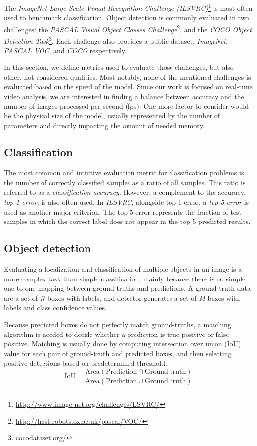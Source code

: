 The \textit{ImageNet Large Scale Visual Recognition Challenge (ILSVRC)}\footnote{\url{http://www.image-net.org/challenges/LSVRC/}} is most often used to benchmark classification. Object detection is commonly evaluated in two challenges: the \textit{PASCAL Visual Object Classes Challenge}\footnote{\url{http://host.robots.ox.ac.uk/pascal/VOC/}}, and the \textit{COCO Object Detection Task}\footnote{\url{cocodataset.org/}}. Each challenge also provides a public dataset, \textit{ImageNet}, \textit{PASCAL VOC}, and \textit{COCO} respectively.

In this section, we define metrics used to evaluate those challenges, but also other, not considered qualities. Most notably, none of the mentioned challenges is evaluated based on the speed of the model. Since our work is focused on real-time video analysis, we are interested in finding a balance between accuracy and the number of images processed per second (fps). One more factor to consider would be the physical size of the model, usually represented by the number of parameters and directly impacting the amount of needed memory.

\subsection{Classification}
The most common and intuitive evaluation metric for classification problems is the number of correctly classified samples as a ratio of all samples. This ratio is referred to as a \textit{classification accuracy}. However, a complement to the accuracy, \textit{top-1 error}, is also often used. In \textit{ILSVRC},  alongside top-1 error, a \textit{top-5 error} is used as another major criterion. The top-5 error represents the fraction of test samples in which the correct label does not appear in the top 5 predicted results.

\subsection{Object detection}
Evaluating a localization and classification of multiple objects in an image is a more complex task than simple classification, mainly because there is no simple one-to-one mapping between ground-truths and predictions. A ground-truth data are a set of \textit{N} boxes with labels, and detector generates a set of \textit{M} boxes with labels and class confidence values.

Because predicted boxes do not perfectly match ground-truths, a matching algorithm is needed to decide whether a prediction is true positive or false positive. Matching is usually done by computing intersection over union (IoU) value for each pair of ground-truth and predicted boxes, and then selecting positive detections based on predetermined threshold.
$$\text{IoU} = \frac{\text{Area}(\text{Prediction} \cap \text{Ground truth})}{\text{Area}(\text{Prediction} \cup \text{Ground truth})}$$

